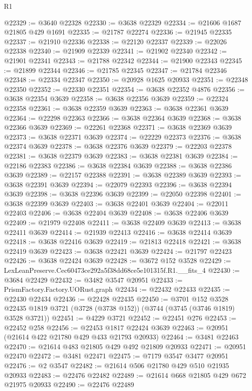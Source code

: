 \begin{lexlean}{R1}
\begin{coremodule}
@22329 := @3640 @22328
@22330 := @3638 @22329
@22334 := @21606 @1687 @21805 @429 @1691
@22335 := @21787 @22274
@22336 := @21945 @22335
@22337 := @21910 @22336
@22338 := @22120 @22337
@22339 := @22026 @22338
@22340 := @21909 @22339
@22341 := @21902 @22340
@22342 := @21901 @22341
@22343 := @21788 @22342
@22344 := @21900 @22343
@22345 := @21899 @22344
@22346 := @21785 @22345
@22347 := @21784 @22346
@22348 := @22334 @22347
@22350 := @20928 @1625 @20933
@22351 := @22348 @22350
@22352 := @22330 @22351
@22354 := @3638 @22352 @4876
@22356 := @3638 @22354 @3639
@22358 := @3638 @22356 @3639
@22359 := @22324 @22358
@22361 := @3638 @22359 @3639
@22363 := @3638 @22361 @3639
@22364 := @22298 @22363
@22366 := @3638 @22364 @3639
@22368 := @3638 @22366 @3639
@22369 := @22261 @22368
@22371 := @3638 @22369 @3639
@22373 := @3638 @22371 @3639
@22374 := @22229 @22373
@22376 := @3638 @22374 @3639
@22378 := @3638 @22376 @3639
@22379 := @22203 @22378
@22381 := @3638 @22379 @3639
@22383 := @3638 @22381 @3639
@22384 := @22186 @22383
@22386 := @3638 @22384 @3639
@22388 := @3638 @22386 @3639
@22389 := @22157 @22388
@22391 := @3638 @22389 @3639
@22393 := @3638 @22391 @3639
@22394 := @22079 @22393
@22396 := @3638 @22394 @3639
@22398 := @3638 @22396 @3639
@22399 := @22050 @22398
@22401 := @3638 @22399 @3639
@22403 := @3638 @22401 @3639
@22404 := @22011 @22403
@22406 := @3638 @22404 @3639
@22408 := @3638 @22406 @3639
@22409 := @21979 @22408
@22411 := @3638 @22409 @3639
@22413 := @3638 @22411 @3639
@22414 := @21939 @22413
@22416 := @3638 @22414 @3639
@22418 := @3638 @22416 @3639
@22419 := @21813 @22418
@22421 := @3638 @22419 @3639
@22423 := @3638 @22421 @3639
@22424 := @21797 @22423
@22426 := @3638 @22424 @3639
@22428 := @3672 @152 @3528
@22429 := LexLeanPreserve.Cec60473ce292a5f38dd68ce5e101315f.R1.__fits_4
@22430 := @3684 @22429
@22432 := @3482 @3547 @20951
@22433 := PrismFactory.Factory.UORust.graph
@22434 := @22432 @22433
@22435 := @22430 @22434
@22436 := @22428 @22435
@22450 := @3701
    @152
    @3528
    @22435
    @1819
    @3721
    (@3728 (@3738 @152))
    (@3744 (@3745 (@3746 @1819) @3528 @3721))
@22451 := @4229 @3721
@22452 := @22451 @276
@22453 := @22452 @258
@22456 := @22453 @1817 @22424 @3639
@22463 := @20951 (@21614 @422 @21780 @429 @433 @21793 @20933)
@22464 := @3481 @22463
@22470 := @21614 @483 @21805 @429 @492 @21809 @20933
@22471 := @20951 @22470
@22472 := @3481 @22471
@22475 := @7179 @3547 @3477 @20951
@22476 := @2 @3547
@22482 := @21614 @506 @21780 @429 @510 @21935 @20933
@22483 := @22476 @22482
@22489 := @21614 @668 @21805 @429 @672 @21975 @20933
@22490 := @22476 @22489

\end{coremodule}
\end{lexlean}
